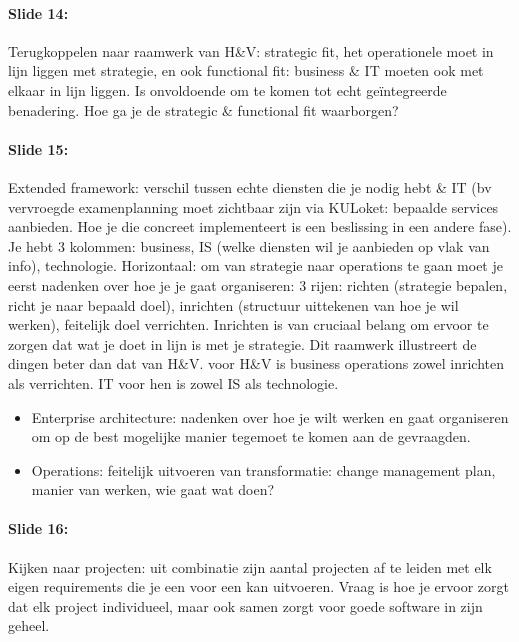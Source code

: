 \documentclass[10pt,a4paper]{report}
\begin{document}
\paragraph{Slide 14:}Terugkoppelen naar raamwerk van H\&V: strategic fit, het operationele moet in lijn liggen met strategie, en ook functional fit: business \& IT moeten ook met elkaar in lijn liggen. Is onvoldoende om te komen tot echt geïntegreerde benadering. Hoe ga je de strategic \& functional fit waarborgen?

\paragraph{Slide 15:}Extended framework: verschil tussen echte diensten die je nodig hebt \& IT (bv vervroegde examenplanning moet zichtbaar zijn via KULoket: bepaalde services aanbieden. Hoe je die concreet implementeert is een beslissing in een andere fase). Je hebt 3 kolommen: business, IS (welke diensten wil je aanbieden op vlak van info), technologie. Horizontaal: om van strategie naar operations te gaan moet je eerst nadenken over hoe je je gaat organiseren: 3 rijen: richten (strategie bepalen, richt je naar bepaald doel), inrichten (structuur uittekenen van hoe je wil werken), feitelijk doel verrichten. Inrichten is van cruciaal belang om ervoor te zorgen dat wat je doet in lijn is met je strategie. Dit raamwerk illustreert de dingen beter dan dat van H\&V. voor H\&V is business operations zowel inrichten als verrichten. IT voor hen is zowel IS als technologie.
\begin{itemize}
\item Enterprise architecture: nadenken over hoe je wilt werken en gaat organiseren om op de best mogelijke manier tegemoet te komen aan de gevraagden.
\item Operations: feitelijk uitvoeren van transformatie: change management plan, manier van werken, wie gaat wat doen?
\end{itemize}	
	
\paragraph{Slide 16:}Kijken naar projecten: uit combinatie zijn aantal projecten af te leiden met elk eigen requirements die je een voor een kan uitvoeren. Vraag is hoe je ervoor zorgt dat elk project individueel, maar ook samen zorgt voor goede software in zijn geheel. 
\end{document}
